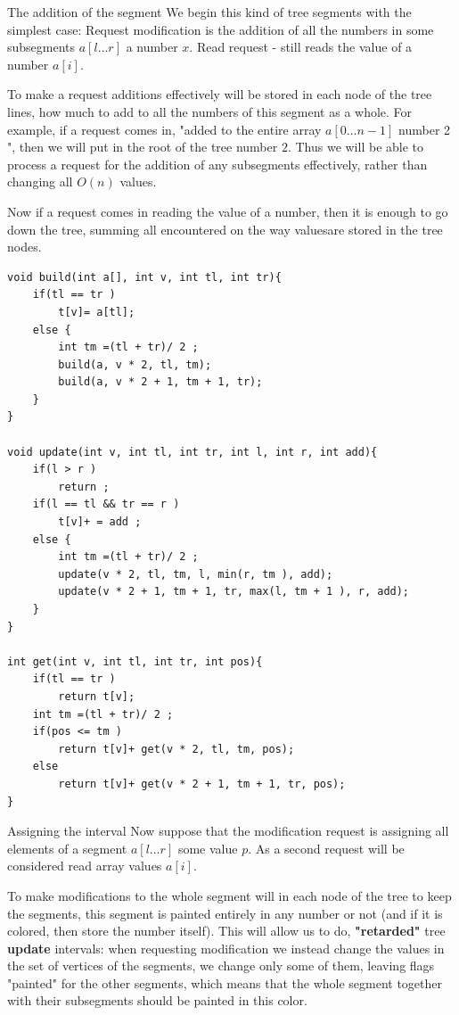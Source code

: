 The addition of the segment
We begin this kind of tree segments with the simplest case: Request modification is the addition of all the numbers in some subsegments $a [l \ldots r]$ a number $x$. Read request - still reads the value of a number $a [i]$.

To make a request additions effectively will be stored in each node of the tree lines, how much to add to all the numbers of this segment as a whole. For example, if a request comes in, "added to the entire array $a [0 \ldots n-1]$ number 2 ", then we will put in the root of the tree number $2$. Thus we will be able to process a request for the addition of any subsegments effectively, rather than changing all $O (n)$ values.

Now if a request comes in reading the value of a number, then it is enough to go down the tree, summing all encountered on the way values ​​are stored in the tree nodes.

\begin{verbatim}
void build(int a[], int v, int tl, int tr){
    if(tl == tr )
        t[v]= a[tl];
    else {
        int tm =(tl + tr)/ 2 ;
        build(a, v * 2, tl, tm);
        build(a, v * 2 + 1, tm + 1, tr);
    }
}
 
void update(int v, int tl, int tr, int l, int r, int add){
    if(l > r )
        return ;
    if(l == tl && tr == r )
        t[v]+ = add ;
    else {
        int tm =(tl + tr)/ 2 ;
        update(v * 2, tl, tm, l, min(r, tm ), add);
        update(v * 2 + 1, tm + 1, tr, max(l, tm + 1 ), r, add);
    }
}
 
int get(int v, int tl, int tr, int pos){
    if(tl == tr )
        return t[v];
    int tm =(tl + tr)/ 2 ;
    if(pos <= tm )
        return t[v]+ get(v * 2, tl, tm, pos);
    else
        return t[v]+ get(v * 2 + 1, tm + 1, tr, pos);
} 
\end{verbatim}
Assigning the interval
Now suppose that the modification request is assigning all elements of a segment $a [l \ldots r]$ some value $p$. As a second request will be considered read array values $a [i]$.

To make modifications to the whole segment will in each node of the tree to keep the segments, this segment is painted entirely in any number or not (and if it is colored, then store the number itself). This will allow us to do, \textbf{"retarded"} tree \textbf{update} intervals: when requesting modification we instead change the values ​​in the set of vertices of the segments, we change only some of them, leaving flags "painted" for the other segments, which means that the whole segment together with their subsegments should be painted in this color.

